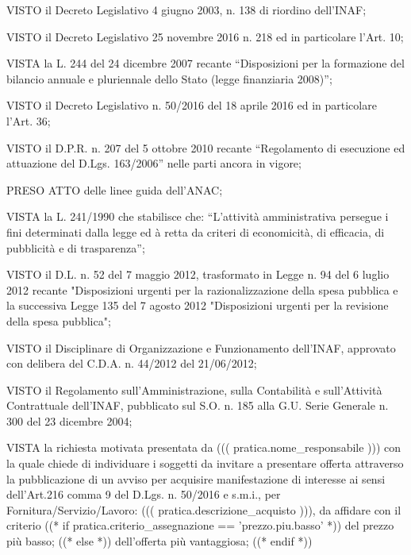 \documentclass[a4paper,12pt]{letter}
\begin{document}
\begin{list}{VALUTATA}{}
\item[VISTO] il Decreto Legislativo 4 giugno 2003, n. 138 di riordino dell'INAF;
\item[VISTO] il Decreto Legislativo 25 novembre 2016 n. 218 ed in particolare l'Art. 10;
\item[VISTA] la L. 244 del 24 dicembre 2007 recante ``Disposizioni per la formazione 
        del bilancio annuale e pluriennale dello Stato (legge finanziaria 2008)''; 
\item[VISTO]  il Decreto Legislativo n. 50/2016 del 18 aprile 2016 ed in particolare
      l'Art. 36;
\item[VISTO] il D.P.R. n. 207 del 5 ottobre 2010 recante ``Regolamento di esecuzione 
        ed attuazione del D.Lgs. 163/2006'' nelle parti ancora in vigore; 
\item[PRESO ATTO] delle linee guida dell'ANAC;
\item[VISTA] la L. 241/1990 che stabilisce che: ``L'attività amministrativa persegue i 
        fini determinati dalla legge ed à retta da criteri di economicità, di 
        efficacia, di pubblicità e di trasparenza'';
\item[VISTO] il D.L. n. 52 del 7 maggio 2012, trasformato in Legge n. 94 del 6 luglio 2012 
        recante "Disposizioni urgenti per la razionalizzazione della spesa pubblica 
        e la successiva Legge 135 del 7 agosto 2012 "Disposizioni urgenti per la 
        revisione della spesa pubblica"; 
\item[VISTO] il Disciplinare di Organizzazione e Funzionamento dell'INAF, approvato
        con delibera del C.D.A. n. 44/2012 del 21/06/2012;
\item[VISTO] il Regolamento sull'Amministrazione, sulla Contabilità e sull'Attività 
        Contrattuale dell'INAF, pubblicato sul S.O. n. 185 alla G.U. Serie Generale 
        n. 300 del 23 dicembre 2004;   
\item[VISTA] la richiesta motivata presentata da ((( pratica.nome_responsabile )))
	con la quale chiede di individuare i soggetti da invitare a presentare offerta
	attraverso la pubblicazione di un avviso per acquisire manifestazione
	di interesse ai sensi dell'Art.216 comma 9
        del D.Lgs. n. 50/2016 e s.m.i., per Fornitura/Servizio/Lavoro:
	((( pratica.descrizione_acquisto ))), da affidare con il criterio %
   ((* if pratica.criterio_assegnazione == 'prezzo.piu.basso' *)) %
del prezzo più basso;
   ((* else *)) %
dell'offerta più vantaggiosa;
   ((* endif *))

\end{list}
\end{document}
